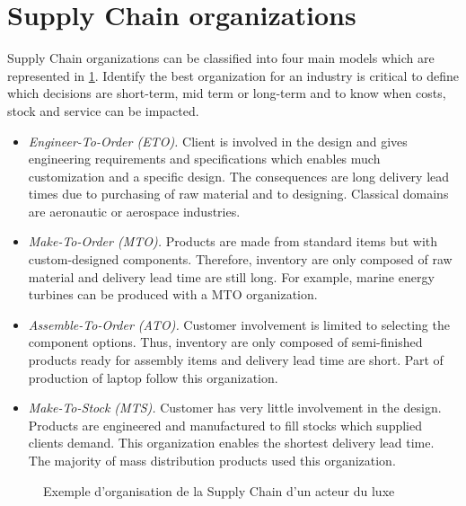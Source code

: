 \section{Supply Chain organizations}


Supply Chain organizations can be classified into four main models \cite{arnold2007} which are represented in \cref{fig:supply-chain-models}.
Identify the best organization for an industry is critical to define which decisions are short-term, mid term or long-term and to know when costs, stock and service can be impacted.
\begin{itemize}
  \item \emph{Engineer-To-Order (ETO).}
  Client is involved in the design and gives engineering requirements and specifications which enables much customization and a specific design.
  The consequences are long delivery lead times due to purchasing of raw material and to designing.
  Classical domains are aeronautic or aerospace industries.

  \item \emph{Make-To-Order (MTO).}
  Products are made from standard items but with custom-designed components.
  Therefore, inventory are only composed of raw material and delivery lead time are still long.
  For example, marine energy turbines can be produced with a MTO organization.

  \item \emph{Assemble-To-Order (ATO).}
  Customer involvement is limited to selecting the component options.
  Thus, inventory are only composed of semi-finished products ready for assembly items and delivery lead time are short.
  Part of production of laptop follow this organization.

  \item \emph{Make-To-Stock (MTS).}
  Customer has very little involvement in the design.
  Products are engineered and manufactured to fill stocks which supplied clients demand.
  This organization enables the shortest delivery lead time.
  The majority of mass distribution products used this organization.
\end{itemize}


\begin{figure}[h]
  \centering
  \caption{Exemple d'organisation de la Supply Chain d'un acteur du luxe}
  \label{fig:supply-chain-models}
\end{figure}



